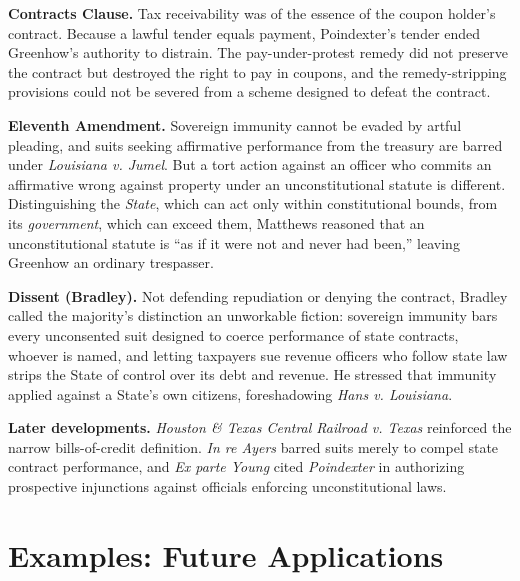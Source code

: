 \documentclass[12pt]{article}
\begin{document}
\textbf{Contracts Clause.} Tax receivability was of the essence of the coupon holder's contract. Because a lawful tender equals payment, Poindexter's tender ended Greenhow's authority to distrain. The pay-under-protest remedy did not preserve the contract but destroyed the right to pay in coupons, and the remedy-stripping provisions could not be severed from a scheme designed to defeat the contract.

\textbf{Eleventh Amendment.} Sovereign immunity cannot be evaded by artful pleading, and suits seeking affirmative performance from the treasury are barred under \textit{Louisiana v. Jumel}. But a tort action against an officer who commits an affirmative wrong against property under an unconstitutional statute is different. Distinguishing the \textit{State}, which can act only within constitutional bounds, from its \textit{government}, which can exceed them, Matthews reasoned that an unconstitutional statute is ``as if it were not and never had been,'' leaving Greenhow an ordinary trespasser.

\textbf{Dissent (Bradley).} Not defending repudiation or denying the contract, Bradley called the majority's distinction an unworkable fiction: sovereign immunity bars every unconsented suit designed to coerce performance of state contracts, whoever is named, and letting taxpayers sue revenue officers who follow state law strips the State of control over its debt and revenue. He stressed that immunity applied against a State's own citizens, foreshadowing \textit{Hans v. Louisiana}.

\textbf{Later developments.} \textit{Houston \& Texas Central Railroad v. Texas} reinforced the narrow bills-of-credit definition. \textit{In re Ayers} barred suits merely to compel state contract performance, and \textit{Ex parte Young} cited \textit{Poindexter} in authorizing prospective injunctions against officials enforcing unconstitutional laws.

\section{Examples: Future Applications}
\end{document}
